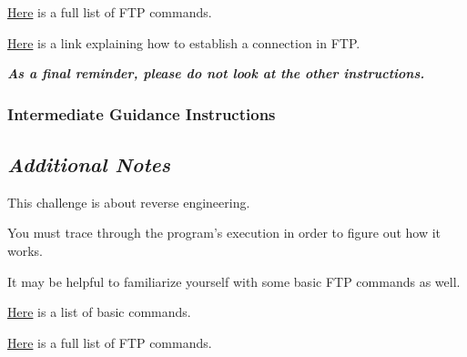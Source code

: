 {{{                    \href{https://en.wikipedia.org/wiki/List_of_FTP_commands}{Here} is a full list of FTP commands.







                    \href{https://www.serv-u.com/resource/tutorial/pasv-response-epsv-port-pbsz-rein-ftp-command#fac52a38-7ddb-4815-a9dc-72cc03c0a8e6}{Here} is a link explaining how to establish a connection in FTP.







                    \textbf{\textit{As a final reminder, please do not look at the other instructions.}}



            }



        \newpage



        \subsubsection{Intermediate Guidance Instructions}



            {\parindent0pt\singlespacing



                \subsection*{\textit{Additional Notes}}



                    This challenge is about reverse engineering. %



You must trace through the program's execution in order to figure out how it works. %



It may be helpful to familiarize yourself with some basic FTP commands as well. 







                    \href{https://kb.iu.edu/d/aenq}{Here} is a list of basic commands.







                    \href{https://en.wikipedia.org/wiki/List_of_FTP_commands}{Here} is a full list of FTP commands.







}}}
